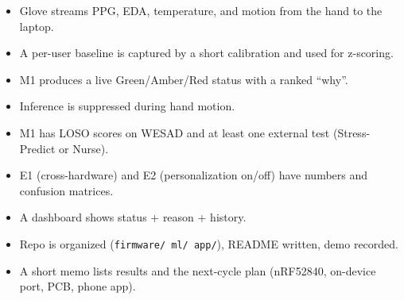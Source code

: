 \documentclass[11pt]{article}
\begin{document}
\begin{tcolorbox}[colback=nsgreen!5, colframe=nsgreen, boxrule=1pt, arc=3pt,
  left=12pt, right=10pt, top=8pt, bottom=8pt]
\begin{itemize}[label={\textcolor{nsgreen}{$\checkmark$}}, leftmargin=1.6em, itemsep=4pt]
\item Glove streams PPG, EDA, temperature, and motion from the hand to the laptop.
\item A per-user baseline is captured by a short calibration and used for z-scoring.
\item M1 produces a live Green/Amber/Red status with a ranked ``why''.
\item Inference is suppressed during hand motion.
\item M1 has LOSO scores on WESAD and at least one external test (Stress-Predict or Nurse).
\item E1 (cross-hardware) and E2 (personalization on/off) have numbers and confusion matrices.
\item A dashboard shows status + reason + history.
\item Repo is organized (\texttt{firmware/ ml/ app/}), README written, demo recorded.
\item A short memo lists results and the next-cycle plan (nRF52840, on-device port, PCB, phone app).
\end{itemize}
\end{tcolorbox}
\end{document}
